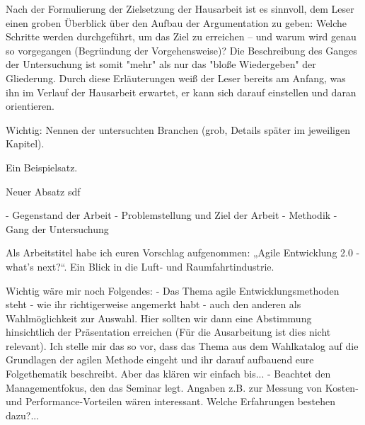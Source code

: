 Nach der Formulierung der Zielsetzung der Hausarbeit ist es sinnvoll, dem Leser einen groben Überblick über den Aufbau der Argumentation zu geben: Welche Schritte werden durchgeführt, um das Ziel zu erreichen – und warum wird genau so vorgegangen (Begründung der Vorgehensweise)? Die Beschreibung des Ganges der Untersuchung ist somit "mehr" als nur das "bloße Wiedergeben" der Gliederung. Durch diese Erläuterungen weiß der Leser bereits am Anfang, was ihn im Verlauf der Hausarbeit erwartet, er kann sich darauf einstellen und daran orientieren.

Wichtig: Nennen der untersuchten Branchen (grob, Details später im jeweiligen Kapitel).


Ein Beispielsatz. \parencite[Vgl.][S. 20]{Thompson:1984:RTT:358198.358210}

Neuer Absatz sdf

- Gegenstand der Arbeit
- Problemstellung und Ziel der Arbeit 
- Methodik
- Gang der Untersuchung

Als Arbeitstitel habe ich euren Vorschlag aufgenommen: „Agile Entwicklung 2.0 - what's next?“. Ein Blick in die Luft- und Raumfahrtindustrie.

Wichtig wäre mir noch Folgendes: 
- Das Thema agile Entwicklungsmethoden steht - wie ihr richtigerweise angemerkt habt - auch den anderen als Wahlmöglichkeit zur Auswahl. Hier sollten wir dann eine Abstimmung hinsichtlich der Präsentation erreichen (Für die Ausarbeitung ist dies nicht relevant). Ich stelle mir das so vor, dass das Thema aus dem Wahlkatalog auf die Grundlagen der agilen Methode eingeht und ihr darauf aufbauend eure Folgethematik beschreibt. Aber das klären wir einfach bis...
- Beachtet den Managementfokus, den das Seminar legt. Angaben z.B. zur Messung von Kosten- und Performance-Vorteilen wären interessant. Welche Erfahrungen bestehen dazu?...